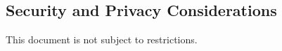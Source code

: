 \subsection{Security and Privacy Considerations}
\label{loc:DocOverview_CUI}

\ifthenelse{\equal{\KNEADcuiStatus}{}}
{
	This document is not subject to \CUI restrictions.
}%
{%
	
}
